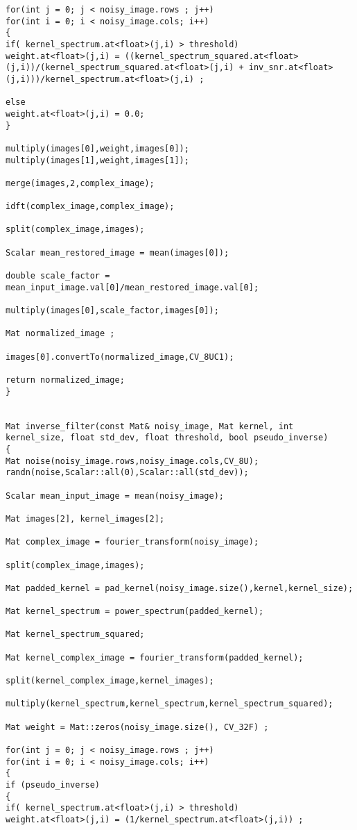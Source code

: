 \begin{lstlisting}
for(int j = 0; j < noisy_image.rows ; j++)
for(int i = 0; i < noisy_image.cols; i++)
{
if( kernel_spectrum.at<float>(j,i) > threshold)
weight.at<float>(j,i) = ((kernel_spectrum_squared.at<float>(j,i))/(kernel_spectrum_squared.at<float>(j,i) + inv_snr.at<float>(j,i)))/kernel_spectrum.at<float>(j,i) ;

else
weight.at<float>(j,i) = 0.0;
}

multiply(images[0],weight,images[0]);
multiply(images[1],weight,images[1]);

merge(images,2,complex_image);

idft(complex_image,complex_image);

split(complex_image,images);

Scalar mean_restored_image = mean(images[0]);

double scale_factor = mean_input_image.val[0]/mean_restored_image.val[0];

multiply(images[0],scale_factor,images[0]);

Mat normalized_image ;

images[0].convertTo(normalized_image,CV_8UC1);

return normalized_image;
}


Mat inverse_filter(const Mat& noisy_image, Mat kernel, int kernel_size, float std_dev, float threshold, bool pseudo_inverse)
{
Mat noise(noisy_image.rows,noisy_image.cols,CV_8U);
randn(noise,Scalar::all(0),Scalar::all(std_dev));

Scalar mean_input_image = mean(noisy_image);  

Mat images[2], kernel_images[2];

Mat complex_image = fourier_transform(noisy_image);

split(complex_image,images);

Mat padded_kernel = pad_kernel(noisy_image.size(),kernel,kernel_size);

Mat kernel_spectrum = power_spectrum(padded_kernel);

Mat kernel_spectrum_squared;

Mat kernel_complex_image = fourier_transform(padded_kernel);

split(kernel_complex_image,kernel_images);

multiply(kernel_spectrum,kernel_spectrum,kernel_spectrum_squared);

Mat weight = Mat::zeros(noisy_image.size(), CV_32F) ; 

for(int j = 0; j < noisy_image.rows ; j++)
for(int i = 0; i < noisy_image.cols; i++)
{
if (pseudo_inverse)
{
if( kernel_spectrum.at<float>(j,i) > threshold)
weight.at<float>(j,i) = (1/kernel_spectrum.at<float>(j,i)) ;


\end{lstlisting}
